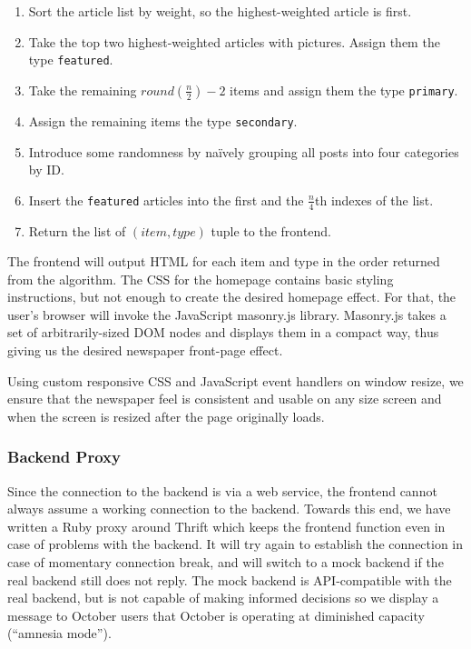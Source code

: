 \documentclass[11pt,letterpaper,titlepage]{article}
\begin{document}
\begin{enumerate}
\item Sort the article list by weight, so the highest-weighted article is first.
\item Take the top two highest-weighted articles with pictures. Assign them the type \verb+featured+.
\item Take the remaining $round(\frac{n}{2}) - 2$ items and assign them the type \verb+primary+.
\item Assign the remaining items the type \verb+secondary+.
\item Introduce some randomness by na\"{i}vely grouping all posts into four categories by ID.
\item Insert the \verb+featured+ articles into the first and the $\frac{n}{4}$th indexes of the list.
\item Return the list of $(item, type)$ tuple to the frontend.
\end{enumerate}

The frontend will output HTML for each item and type in the order returned from the algorithm.
The CSS for the homepage contains basic styling instructions, but not enough to create the desired homepage effect.
For that, the user's browser will invoke the JavaScript masonry.js library\cite{masonry}.
Masonry.js takes a set of arbitrarily-sized DOM nodes and displays them in a compact way, thus giving us the desired newspaper front-page effect.

Using custom responsive CSS and JavaScript event handlers on window resize, we ensure that the newspaper feel is consistent and usable on any size screen and when the screen is resized after the page originally loads.

\subsubsection{Backend Proxy}

Since the connection to the backend is via a web service, the frontend cannot always assume a working connection to the backend.
Towards this end, we have written a Ruby proxy around Thrift which keeps the frontend function even in case of problems with the backend.
It will try again to establish the connection in case of momentary connection break, and will switch to a mock backend if the real backend still does not reply. The mock backend is API-compatible with the real backend, but is not capable of making informed decisions so we display a message to October users that October is operating at diminished capacity (``amnesia mode'').
\end{document}
